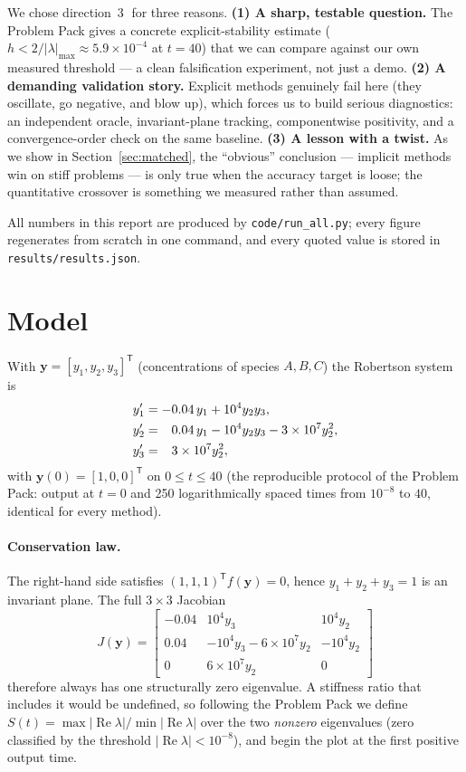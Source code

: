 ﻿\documentclass[11pt,a4paper]{article}
\newcommand{\yy}{\mathbf{y}}
\begin{document}
We chose direction~\textcircled{\scriptsize 3} for three reasons.
\textbf{(1) A sharp, testable question.}  The Problem Pack gives a concrete
explicit-stability estimate ($h<2/|\lambda|_{\max}\approx 5.9\times10^{-4}$ at
$t=40$) that we can compare against our own measured threshold --- a clean
falsification experiment, not just a demo.
\textbf{(2) A demanding validation story.}  Explicit methods genuinely fail
here (they oscillate, go negative, and blow up), which forces us to build
serious diagnostics: an independent oracle, invariant-plane tracking,
componentwise positivity, and a convergence-order check on the same baseline.
\textbf{(3) A lesson with a twist.}  As we show in
Section~\ref{sec:matched}, the ``obvious'' conclusion --- implicit methods win
on stiff problems --- is only true when the accuracy target is loose; the
quantitative crossover is something we measured rather than assumed.

All numbers in this report are produced by \texttt{code/run\_all.py}; every
figure regenerates from scratch in one command, and every quoted value is
stored in \texttt{results/results.json}.

\section{Model}\label{sec:model}
With $\yy=[y_1,y_2,y_3]^{\mathsf T}$ (concentrations of species $A,B,C$) the
Robertson system is
\begin{align}
y_1' &= -0.04\,y_1 + 10^4 y_2 y_3, \notag\\
y_2' &= \phantom{-}0.04\,y_1 - 10^4 y_2 y_3 - 3\times10^7 y_2^2, \label{eq:robertson}\\
y_3' &= \phantom{-}3\times 10^7 y_2^2, \notag
\end{align}
with $\yy(0)=[1,0,0]^{\mathsf T}$ on $0\le t\le 40$ (the reproducible protocol
of the Problem Pack: output at $t=0$ and 250 logarithmically spaced times from
$10^{-8}$ to $40$, identical for every method).

\paragraph{Conservation law.}  The right-hand side satisfies
$(1,1,1)^{\mathsf T}f(\yy)=0$, hence $y_1+y_2+y_3=1$ is an invariant plane.
The full $3\times 3$ Jacobian
\begin{equation}
J(\yy)=\begin{bmatrix}
-0.04 & 10^4y_3 & 10^4y_2\\
0.04 & -10^4y_3-6\times10^7y_2 & -10^4y_2\\
0 & 6\times10^7 y_2 & 0
\end{bmatrix}
\end{equation}
therefore always has one structurally zero eigenvalue.  A stiffness ratio that
includes it would be undefined, so following the Problem Pack we define
$S(t)=\max|\operatorname{Re}\lambda|/\min|\operatorname{Re}\lambda|$ over the
two \emph{nonzero} eigenvalues (zero classified by the threshold
$|\operatorname{Re}\lambda|<10^{-8}$), and begin the plot at the first
positive output time.
\end{document}

